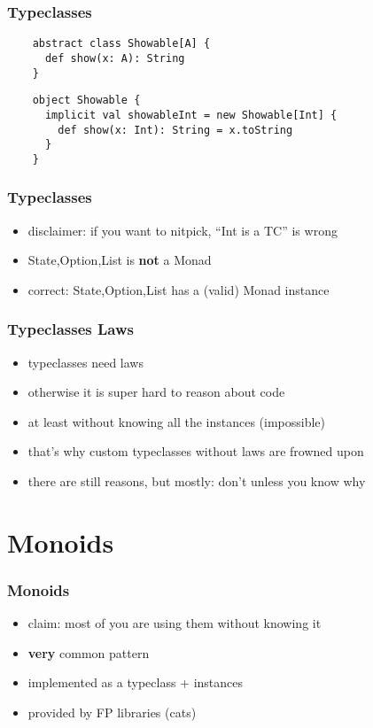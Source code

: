 \documentclass[aspectratio=169]{beamer}
\begin{document}
\begin{frame}[fragile]
  \frametitle{Typeclasses}
  \begin{verbatim}
    abstract class Showable[A] {
      def show(x: A): String
    }
  \end{verbatim}
  \begin{verbatim}
    object Showable {
      implicit val showableInt = new Showable[Int] {
        def show(x: Int): String = x.toString
      }
    }
  \end{verbatim}
\end{frame}

\begin{frame}
  \frametitle{Typeclasses}
  \begin{itemize}
  \item disclaimer: if you want to nitpick, ``Int is a TC'' is wrong
  \item {State,Option,List} is \textbf{not} a Monad
  \item correct: {State,Option,List} has a (valid) Monad instance
  \end{itemize}
\end{frame}

\begin{frame}
  \frametitle{Typeclasses \textemdash{} Laws}
  \begin{itemize}
  \item typeclasses need laws
  \item otherwise it is super hard to reason about code
  \item at least without knowing all the instances (impossible)
  \item that's why custom typeclasses without laws are frowned upon
  \item there are still reasons, but mostly: don't unless you know why
  \end{itemize}
\end{frame}

\section{Monoids}\label{sec:monoids}

\begin{frame}
  \frametitle{Monoids}
  \begin{itemize}
  \item claim: most of you are using them without knowing it
  \item \textbf{very} common pattern
  \item implemented as a typeclass + instances
  \item provided by FP libraries (cats)
  \end{itemize}
\end{frame}
\end{document}
